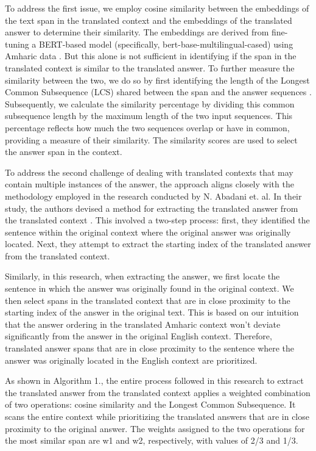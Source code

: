 To address the first issue, we employ cosine similarity between the embeddings of the text span in the translated context and the embeddings of the translated answer to determine their similarity. The embeddings are derived from fine-tuning a BERT-based model (specifically, bert-base-multilingual-cased) using Amharic data \cite{davlan_bert_amharic}. But this alone is not sufficient in identifying if the span in the translated context is similar to the translated answer. To further measure the similarity between the two, we do so by first identifying the length of the Longest Common Subsequence (LCS) shared between the span and the answer sequences \cite{cormen2022introduction}. Subsequently, we calculate the similarity percentage by dividing this common subsequence length by the maximum length of the two input sequences. This percentage reflects how much the two sequences overlap or have in common, providing a measure of their similarity.  The similarity scores are used to select the answer span in the context.

To address the second challenge of dealing with translated contexts that may contain multiple instances of the answer, the approach aligns closely with the methodology employed in the research conducted by N. Abadani et. al. In their study, the authors devised a method for extracting the translated answer from the translated context \cite{abadani2021parsquad}. This involved a two-step process: first, they identified the sentence within the original context where the original answer was originally located. Next, they attempt to extract the starting index of the translated answer from the translated context.   

Similarly, in this research, when extracting the answer, we first locate the sentence in which the answer was originally found in the original context. We then select spans in the translated context that are in close proximity to the starting index of the answer in the original text. This is based on our intuition that the answer ordering in the translated Amharic context won't deviate significantly from the answer in the original English context. Therefore, translated answer spans that are in close proximity to the sentence where the answer was originally located in the English context are prioritized.  

As shown in Algorithm 1., the entire process followed in this research to extract the translated answer from the translated context applies a weighted combination of two operations: cosine similarity and the Longest Common Subsequence. It scans the entire context while prioritizing the translated answers that are in close proximity to the original answer. The weights assigned to the two operations for the most similar span are w1 and w2, respectively, with values of 2/3 and 1/3.



